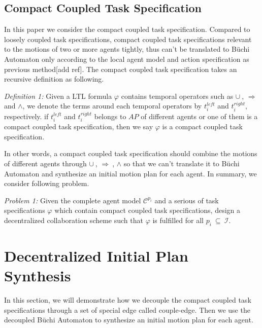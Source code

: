 \documentclass[journal]{IEEEtran}
\begin{document}
\subsection{Compact Coupled Task Specification}
In this paper we consider the compact coupled task specification. Compared to loosely coupled task specifications, compact coupled task specifications relevant to the motions of two or more agents tightly, thus can't be translated to B\"{u}chi Automaton only according to the local agent model and action specification as previous method[add ref]. The compact coupled task specification takes an recursive definition as following.
\par
\emph{Definition 1:} Given a LTL formula $\varphi$ contains temporal operators such as $\cup \ $, $\Longrightarrow$ and  $\wedge$, we denote the terms around each temporal operators by $t^{left}_i$ and $t^{right}_i$, respectively. if $t^{left}_i$ and $t^{right}_i$ belongs to $AP$ of different agents or one of them is a compact coupled task specification, then we say $\varphi$ is a compact coupled task specification.
\par
In other words, a compact coupled task specification should combine the motions of different agents through $\cup \ $, $\Longrightarrow \ $, $\wedge$ so that we can't translate it to B\"{u}chi Automaton and synthesize an initial motion plan for each agent. In summary, we consider following problem.
\par
\emph{Problem 1:}  Given the complete agent model $\mathcal{C}^{p_i}$ and a serious of task specifications $\varphi$ which contain compact coupled task specifications, design a decentralized collaboration scheme such that $\varphi$ is fulfilled for all $p_i \ \subseteq \ \mathcal{I}$.
\section{Decentralized Initial Plan Synthesis}
In this section, we will demonstrate how we decouple the compact coupled task specifications through a set of special edge called couple-edge. Then we use the decoupled B\"{u}chi Automaton to synthesize an initial motion plan for each agent.
\end{document}
